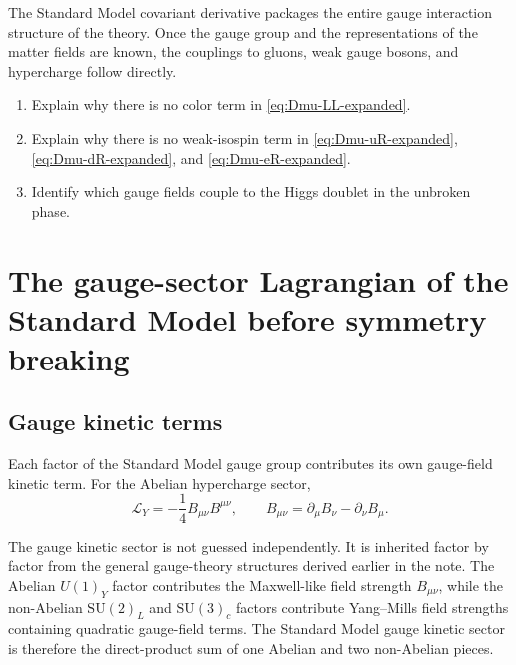 \documentclass[11pt,a4paper]{article}
\newcommand{\Lag}{\mathcal{L}}
\newcommand{\p}{\partial}
\newcommand{\SUc}{\mathrm{SU}(3)_c}
\newcommand{\SUw}{\mathrm{SU}(2)_L}
\begin{document}
\begin{takehomebox}
\vspace{0.25cm}
The Standard Model covariant derivative packages the entire gauge interaction structure of the theory. Once the gauge group and the representations of the matter fields are known, the couplings to gluons, weak gauge bosons, and hypercharge follow directly.
\end{takehomebox}

\begin{guidedchecksbox}
\vspace{0.25cm}
\begin{enumerate}[leftmargin=1.6em,label=\arabic*.]
    \item Explain why there is no color term in \eqref{eq:Dmu-LL-expanded}.
    \item Explain why there is no weak-isospin term in \eqref{eq:Dmu-uR-expanded}, \eqref{eq:Dmu-dR-expanded}, and \eqref{eq:Dmu-eR-expanded}.
    \item Identify which gauge fields couple to the Higgs doublet in the unbroken phase.
\end{enumerate}
\end{guidedchecksbox}





\section{The gauge-sector Lagrangian of the Standard Model before symmetry breaking}

\subsection{Gauge kinetic terms}



Each factor of the Standard Model gauge group contributes its own gauge-field kinetic term. For the Abelian hypercharge sector,
\begin{equation}
\Lag_Y=-\frac14 B_{\mu\nu}B^{\mu\nu},
\qquad
B_{\mu\nu}=\p_\mu B_\nu-\p_\nu B_\mu.
\label{eq:hypercharge-kinetic-expanded}
\end{equation}

The gauge kinetic sector is not guessed independently. It is inherited factor by factor from the general gauge-theory structures derived earlier in the note. The Abelian \(U(1)_Y\) factor contributes the Maxwell-like field strength \(B_{\mu\nu}\), while the non-Abelian \(\SUw\) and \(\SUc\) factors contribute Yang--Mills field strengths containing quadratic gauge-field terms. The Standard Model gauge kinetic sector is therefore the direct-product sum of one Abelian and two non-Abelian pieces.
\end{document}
